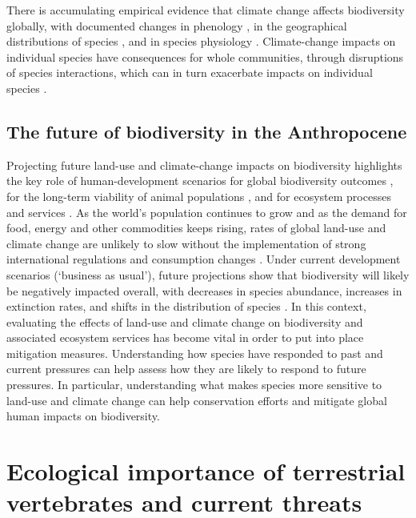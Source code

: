 There is accumulating empirical evidence that climate change affects biodiversity globally, with documented changes in phenology \citep{Inouye2022}, in the geographical distributions of species \citep{Chen2011, Lenoir2015, Soroye2020}, and in species physiology \citep{Portner2008, Chown2010}.  Climate-change impacts on individual species have consequences for whole communities, through disruptions of species interactions, which can in turn exacerbate impacts on individual species \citep{Cahill2013, Kharouba2018}. 


\subsection{The future of biodiversity in the Anthropocene}

Projecting future land-use and climate-change impacts on biodiversity highlights the key role of human-development scenarios for global biodiversity outcomes \citep{Newbold2018, Powell2013}, for the long-term viability of animal populations \citep{Spooner2018}, and for ecosystem processes and services \citep{Lawler2014}. As the world’s population continues to grow and as the demand for food, energy and other commodities keeps rising, rates of global land-use and climate change are unlikely to slow without the implementation of strong international regulations and consumption changes \citep{IPCC2022, Stehfest2019}. Under current development scenarios (`business as usual'), future projections show that biodiversity will likely be negatively impacted overall, with decreases in species abundance, increases in extinction rates, and shifts in the distribution of species \citep{Schipper2020, Pereira2010, Newbold2018}. In this context, evaluating the effects of land-use and climate change on biodiversity and associated ecosystem services has become vital in order to put into place mitigation measures. Understanding how species have responded to past and current pressures can help assess how they are likely to respond to future pressures. In particular, understanding what makes species more sensitive to land-use and climate change can help conservation efforts and mitigate global human impacts on biodiversity. 


\section{Ecological importance of terrestrial vertebrates and current threats}

